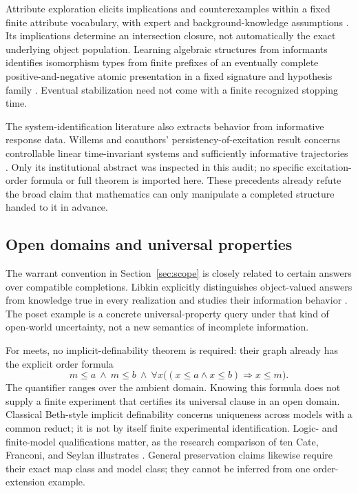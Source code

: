 \documentclass[11pt]{article}
\theoremstyle{remark}
\begin{document}
Attribute exploration elicits implications and counterexamples within a fixed finite attribute vocabulary, with expert and background-knowledge assumptions \cite{Attribute}. Its implications determine an intersection closure, not automatically the exact underlying object population. Learning algebraic structures from informants identifies isomorphism types from finite prefixes of an eventually complete positive-and-negative atomic presentation in a fixed signature and hypothesis family \cite{Informant}. Eventual stabilization need not come with a finite recognized stopping time.

The system-identification literature also extracts behavior from informative response data. Willems and coauthors' persistency-of-excitation result concerns controllable linear time-invariant systems and sufficiently informative trajectories \cite{Willems}. Only its institutional abstract was inspected in this audit; no specific excitation-order formula or full theorem is imported here. These precedents already refute the broad claim that mathematics can only manipulate a completed structure handed to it in advance.

\subsection{Open domains and universal properties}

The warrant convention in Section~\ref{sec:scope} is closely related to certain answers over compatible completions. Libkin explicitly distinguishes object-valued answers from knowledge true in every realization and studies their information behavior \cite{Libkin}. The poset example is a concrete universal-property query under that kind of open-world uncertainty, not a new semantics of incomplete information.

For meets, no implicit-definability theorem is required: their graph already has the explicit order formula
\[
 m\le a\ \wedge\ m\le b\ \wedge\
 \forall x\bigl((x\le a\wedge x\le b)\Rightarrow x\le m\bigr).
\]
The quantifier ranges over the ambient domain. Knowing this formula does not supply a finite experiment that certifies its universal clause in an open domain. Classical Beth-style implicit definability concerns uniqueness across models with a common reduct; it is not by itself finite experimental identification. Logic- and finite-model qualifications matter, as the research comparison of ten Cate, Franconi, and Seylan illustrates \cite{Beth}. General preservation claims likewise require their exact map class and model class; they cannot be inferred from one order-extension example.
\end{document}
